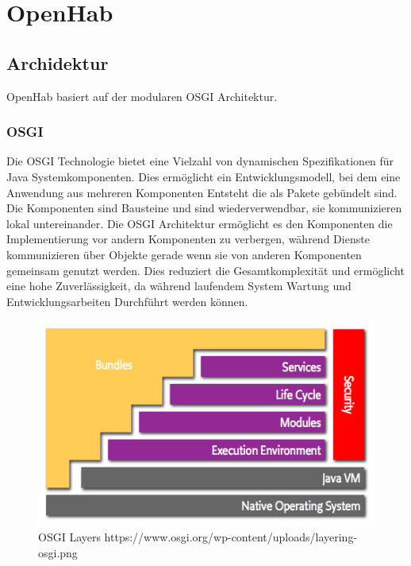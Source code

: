 \section{OpenHab}
\subsection{Archidektur}
OpenHab basiert auf der modularen OSGI Architektur.
\subsubsection{OSGI}
Die OSGI Technologie bietet eine Vielzahl  von dynamischen Spezifikationen für Java Systemkomponenten. Dies ermöglicht ein Entwicklungsmodell, bei dem eine Anwendung aus  mehreren Komponenten Entsteht die als Pakete gebündelt sind. Die Komponenten sind Bausteine und sind wiederverwendbar, sie kommunizieren lokal untereinander. Die OSGI Architektur ermöglicht es den Komponenten die Implementierung vor andern Komponenten zu verbergen, während Dienste kommunizieren über Objekte gerade wenn sie von anderen Komponenten gemeinsam genutzt werden. Dies reduziert die Gesamtkomplexität und ermöglicht eine hohe Zuverlässigkeit, da während laufendem System Wartung und Entwicklungsarbeiten Durchführt werden können.  


 \begin{figure}[H]
	\centering
	\includegraphics[width=\textwidth]{graphics/OSGI.png}
	\caption{OSGI Layers https://www.osgi.org/wp-content/uploads/layering-osgi.png} 	
	\label{pic: OSGILayers}
\end{figure} 

